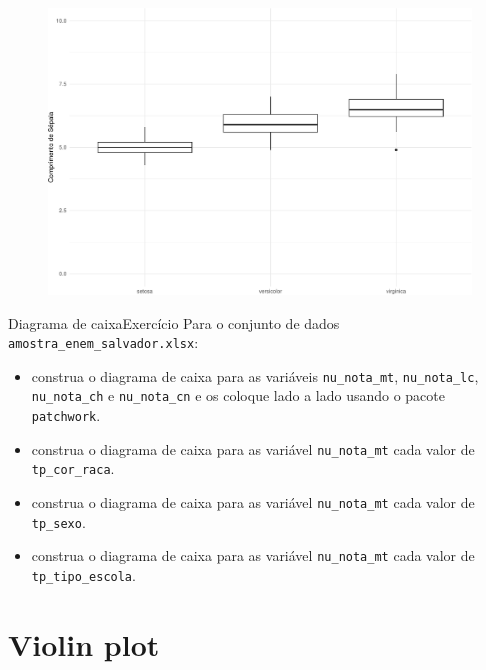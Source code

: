 \documentclass[
  10pt,
  ignorenonframetext,
]{beamer}
\providecommand{\tightlist}{%
  \setlength{\itemsep}{0pt}\setlength{\parskip}{0pt}}\usepackage{longtable,booktabs,array}
\begin{document}
\begin{frame}
\begin{figure}

{\centering \includegraphics[width=1\textwidth,height=\textheight]{exploracao-visualizacao_files/figure-beamer/unnamed-chunk-86-1.pdf}

}

\end{figure}
\end{frame}

\begin{frame}[fragile]{Diagrama de caixa\newline Exercício}
\protect\hypertarget{diagrama-de-caixaexercuxedcio}{}
Para o conjunto de dados \texttt{amostra\_enem\_salvador.xlsx}:

\begin{itemize}
\tightlist
\item
  construa o diagrama de caixa para as variáveis \texttt{nu\_nota\_mt},
  \texttt{nu\_nota\_lc}, \texttt{nu\_nota\_ch} e \texttt{nu\_nota\_cn} e
  os coloque lado a lado usando o pacote \texttt{patchwork}.
\item
  construa o diagrama de caixa para as variável \texttt{nu\_nota\_mt}
  cada valor de \texttt{tp\_cor\_raca}.
\item
  construa o diagrama de caixa para as variável \texttt{nu\_nota\_mt}
  cada valor de \texttt{tp\_sexo}.
\item
  construa o diagrama de caixa para as variável \texttt{nu\_nota\_mt}
  cada valor de \texttt{tp\_tipo\_escola}.
\end{itemize}
\end{frame}

\hypertarget{violin-plot}{%
\section{Violin plot}\label{violin-plot}}
\end{document}

